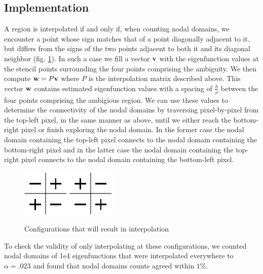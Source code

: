 \documentclass{report}
\begin{document}
\subsection{Implementation}
A region is interpolated if and only if, when counting nodal domains, we encounter a point whose sign matches that of a point diagonally adjacent to it, but differs from the signs of the two points adjacent to both it and its diagonal neighbor (fig. \ref{fig:trouble_spot}). In such a case we fill a vector ${\bf v}$ with the eigenfunction values at the stencil points surrounding the four points comprising the ambiguity. We then compute ${\bf w} = P {\bf v}$ where $P$ is the interpolation matrix described above. This vector ${\bf w}$ contains estimated eigenfunction values with a spacing of $\frac{h}{\rho}$ between the four points comprising the ambigious region. We can use these values to determine the connectivity of the nodal domains by traversing pixel-by-pixel from the top-left pixel, in the same manner as above, until we either reach the bottom-right pixel or finish exploring the nodal domain. In the former case the nodal domain containing the top-left pixel connects to the nodal domain containing the bottom-right pixel and in the latter case the nodal domain containing the top-right pixel connects to the nodal domain containing the bottom-left pixel.

\begin{figure}
  \begin{center}
    \includegraphics[width=0.2\textwidth]{figs/interpolation/trouble_spot1.eps}
    \hspace{1 cm} 
    \includegraphics[width=0.2\textwidth]{figs/interpolation/trouble_spot2.eps}
    \caption{Configurations that will result in interpolation}
    \label{fig:trouble_spot}
  \end{center}
\end{figure}

To check the validity of only interpolating at these configurations, we counted nodal domains of 1e4 eigenfunctions that were interpolated everywhere to $\alpha = .023$ and found that nodal domains counts agreed within $1\%$.
\end{document}
